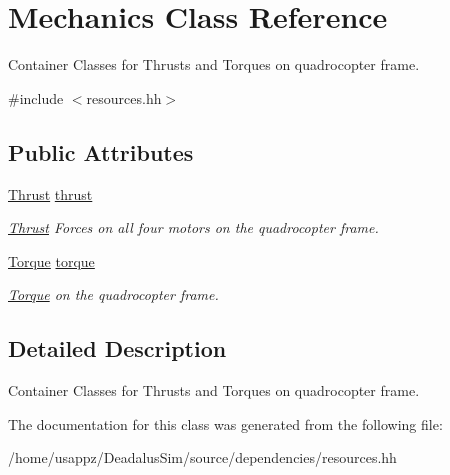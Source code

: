 \hypertarget{classMechanics}{\section{\-Mechanics \-Class \-Reference}
\label{classMechanics}
}


\-Container \-Classes for \-Thrusts and \-Torques on quadrocopter frame.  




{\ttfamily \#include $<$resources.\-hh$>$}

\subsection*{\-Public \-Attributes}
\begin{DoxyCompactItemize}
\item 
\hypertarget{classMechanics_a9ed197f325203c900db04d1bf2389832}{\hyperlink{classThrust}{\-Thrust} \hyperlink{classMechanics_a9ed197f325203c900db04d1bf2389832}{thrust}}\label{classMechanics_a9ed197f325203c900db04d1bf2389832}

\begin{DoxyCompactList}\small\item\em \hyperlink{classThrust}{\-Thrust} \-Forces on all four motors on the quadrocopter frame. \end{DoxyCompactList}\item 
\hypertarget{classMechanics_a4467d7d60ace2a433c2001b21bf4c2d3}{\hyperlink{classTorque}{\-Torque} \hyperlink{classMechanics_a4467d7d60ace2a433c2001b21bf4c2d3}{torque}}\label{classMechanics_a4467d7d60ace2a433c2001b21bf4c2d3}

\begin{DoxyCompactList}\small\item\em \hyperlink{classTorque}{\-Torque} on the quadrocopter frame. \end{DoxyCompactList}\end{DoxyCompactItemize}


\subsection{\-Detailed \-Description}
\-Container \-Classes for \-Thrusts and \-Torques on quadrocopter frame. 

\-The documentation for this class was generated from the following file\-:\begin{DoxyCompactItemize}
\item 
/home/usappz/\-Deadalus\-Sim/source/dependencies/resources.\-hh\end{DoxyCompactItemize}
